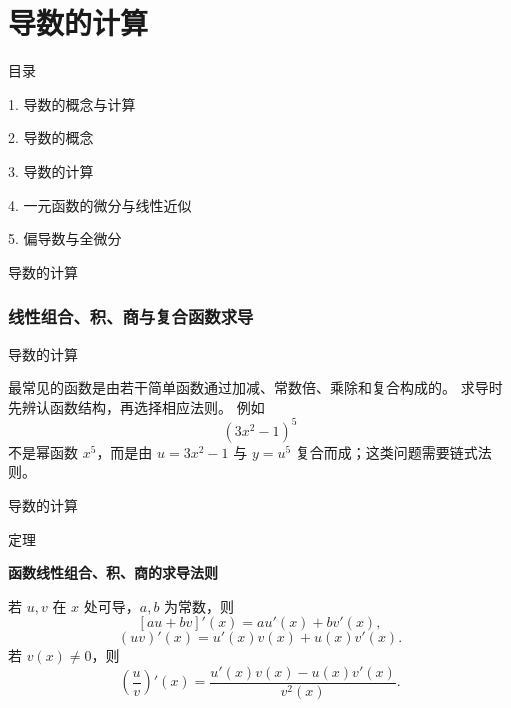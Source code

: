 \documentclass[aspectratio=169,10pt,fontset=fandol]{ctexbeamer}
\begin{document}
\section{导数的计算}
\begin{frame}[t,fragile]{目录}
\normalsize
{\color{black}\normalsize 1. 导数的概念与计算\par}\vspace{0.22em}
{\color{black}\normalsize 2. 导数的概念\par}\vspace{0.22em}
{\color{blue}\normalsize 3. 导数的计算\par}\vspace{0.22em}
{\color{gray!40}\normalsize 4. 一元函数的微分与线性近似\par}\vspace{0.22em}
{\color{gray!40}\normalsize 5. 偏导数与全微分\par}\vspace{0.22em}
\end{frame}
\begin{frame}[t,fragile]{导数的计算}
\footnotesize
{\footnotesize

\subsubsection*{线性组合、积、商与复合函数求导}


}
\end{frame}
\begin{frame}[t,fragile]{导数的计算}
\footnotesize
{\footnotesize
最常见的函数是由若干简单函数通过加减、常数倍、乘除和复合构成的。 求导时先辨认函数结构，再选择相应法则。 例如
\[
(3x^2-1)^5
\]
不是幂函数 $x^5$，而是由 $u=3x^2-1$ 与 $y=u^5$ 复合而成；这类问题需要链式法则。


}
\end{frame}
\begin{frame}[t,fragile]{导数的计算}
\footnotesize
\begin{block}{定理}
{\footnotesize
\textbf{函数线性组合、积、商的求导法则}\par

若 $u,v$ 在 $x$ 处可导，$a,b$ 为常数，则
\[
[au+bv]'(x)=au'(x)+bv'(x),
\]
\[
(uv)'(x)=u'(x)v(x)+u(x)v'(x).
\]
若 $v(x)\neq0$，则
\[
\left(\frac{u}{v}\right)'(x)=\frac{u'(x)v(x)-u(x)v'(x)}{v^2(x)}.
\]

}
\end{block}
\end{frame}
\end{document}
